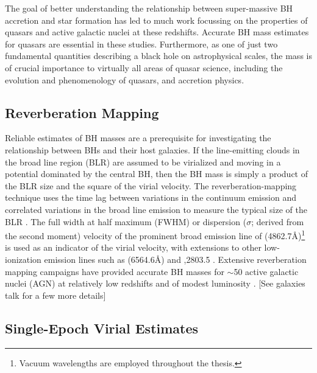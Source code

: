 The goal of better understanding the relationship between super-massive BH accretion and star formation has led to much work focussing on the properties of quasars
and active galactic nuclei at these redshifts.
Accurate BH mass estimates for quasars are essential in these studies. 
Furthermore, as one of just two fundamental quantities describing a black hole on astrophysical
scales, the mass is of crucial importance to virtually all areas of quasar science, including the evolution and phenomenology of quasars, and accretion physics.

\subsection{Reverberation Mapping}

Reliable estimates of BH masses are a prerequisite for investigating the relationship between BHs and their host galaxies.  
If the line-emitting clouds in the broad line region (BLR) are assumed to be virialized and moving in a potential dominated by the central BH, then the BH mass is simply a product of the BLR size and the square of the virial velocity.
The reverberation-mapping technique uses the time lag between variations in the continuum emission and correlated variations in the broad line emission to measure the typical size of the BLR \citep{peterson93,peterson14}. 
The full width at half maximum (FWHM) or dispersion ($\sigma$; derived from the second moment) velocity of the prominent broad emission line of \hb (4862.7\AA)\footnote{Vacuum wavelengths are employed throughout the thesis.} is used as an indicator of the virial velocity, with extensions to other low-ionization emission lines such as \ha (6564.6\AA) and ,2803.5 \citep[e.g.][]{vestergaard02,mclure02,wu04,kollmeier06,onken08,wang09,rafiee11}.
Extensive reverberation mapping campaigns have provided accurate BH masses for $\sim$50 active galactic nuclei (AGN) at relatively low redshifts and of modest luminosity \citep[e.g.][]{kaspi00,kaspi07,peterson04,bentz09,denney10}. 
[See galaxies talk for a few more details]

\subsection{Single-Epoch Virial Estimates}

